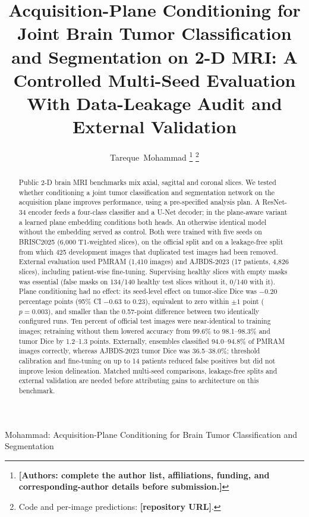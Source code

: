 \documentclass[journal]{IEEEtran}
\begin{document}
\title{Acquisition-Plane Conditioning for Joint Brain Tumor Classification and Segmentation on 2-D MRI: A Controlled Multi-Seed Evaluation With Data-Leakage Audit and External Validation}

\author{Tareque~Mohammad%
\thanks{\textbf{[Authors: complete the author list, affiliations, funding, and corresponding-author details before submission.]}}%
\thanks{Code and per-image predictions: \textbf{[repository URL]}.}}

%
{Mohammad: Acquisition-Plane Conditioning for Brain Tumor Classification and Segmentation}

\maketitle

\begin{abstract}
Public 2-D brain MRI benchmarks mix axial, sagittal and coronal slices. We tested whether conditioning a joint tumor classification and segmentation network on the acquisition plane improves performance, using a pre-specified analysis plan. A ResNet-34 encoder feeds a four-class classifier and a U-Net decoder; in the plane-aware variant a learned plane embedding conditions both heads. An otherwise identical model without the embedding served as control. Both were trained with five seeds on BRISC2025 (6,000 T1-weighted slices), on the official split and on a leakage-free split from which 425 development images that duplicated test images had been removed. External evaluation used PMRAM (1,410 images) and AJBDS-2023 (17 patients, 4,826 slices), including patient-wise fine-tuning. Supervising healthy slices with empty masks was essential (false masks on 134/140 healthy test slices without it, 0/140 with it). Plane conditioning had no effect: its seed-level effect on tumor-slice Dice was $-0.20$ percentage points (95\% CI $-0.63$ to 0.23), equivalent to zero within $\pm1$ point ($p=0.003$), and smaller than the 0.57-point difference between two identically configured runs. Ten percent of official test images were near-identical to training images; retraining without them lowered accuracy from 99.6\% to 98.1--98.3\% and tumor Dice by 1.2--1.3 points. Externally, ensembles classified 94.0--94.8\% of PMRAM images correctly, whereas AJBDS-2023 tumor Dice was 36.5--38.0\%; threshold calibration and fine-tuning on up to 14 patients reduced false positives but did not improve lesion delineation. Matched multi-seed comparisons, leakage-free splits and external validation are needed before attributing gains to architecture on this benchmark.
\end{abstract}
\end{document}
